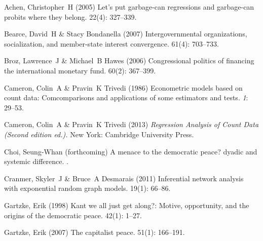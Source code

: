 \documentclass[12pt]{article}
\theoremstyle{hypothesis}
\begin{document}
\begin{thebibliography}{}

Achen, Christopher~H (2005) Let's put garbage-can regressions and garbage-can
  probits where they belong.
 { 22\/}(4): 327--339.

Bearce, David~H  \& Stacy Bondanella (2007) Intergovernmental organizations,
  socialization, and member-state interest convergence.
 { 61\/}(4): 703--733.

Broz, Lawrence~J  \& Michael~B Hawes (2006) Congressional politics of financing
  the international monetary fund.
 { 60\/}(2): 367--399.

Cameron, Colin~A  \& Pravin~K Trivedi (1986) Econometric models based on count
  data: Comcomparisons and applications of some estimators and tests.
 {\em 1}: 29--53.

Cameron, Colin~A  \& Pravin~K Trivedi (2013) {\em { Regression Analysis of
  Count Data\/} (Second edition ed.).}
\newblock New York: Cambridge University Press.

Choi, Seung-Whan (forthcoming) A menace to the democratic peace? dyadic and systemic
  difference.
.

Cranmer, Skyler~J  \& Bruce~A Desmarais (2011) Inferential network analysis
  with exponential random graph models.
 { 19\/}(1): 66--86.

Gartzke, Erik (1998) Kant we all just get along?: Motive, opportunity, and the
  origins of the democratic peace.
 { 42\/}(1): 1--27.

Gartzke, Erik (2007) The capitalist peace.
 { 51\/}(1): 166--191.


\end{thebibliography}
\end{document}
